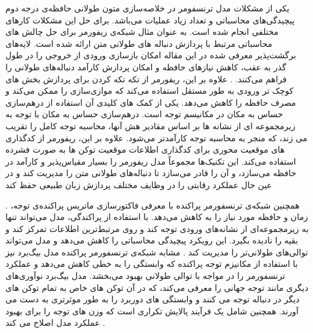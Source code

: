یکی از مشکلات مدل ترنسفومر در خلاصه‌سازی متون طولانی حافظه‌ی درجه دوم پیچیدگی‌های محاسباتی و تعداد زیاد عملیات می‌باشد. برای حل این مشکلات کار‌های مختلفی انجام شده است. به عنوان مثال شبکه‌ی ریفورمر
  برای حل چالش های محاسباتی مرتبط با پردازش دنباله های طولانی متن ارائه شده است.  لایه‌های برگشت‌پذیر
   معرفی شده در این مقاله امکان بازسازی ورودی از خروجی را در طول گذر به عقب، کاهش نیازهای حافظه و امکان پردازش کارآمد دنباله‌های طولانی را فراهم می‌کنند.
   . علاوه بر این، ریفورمر  از تکه تکه کردن برای پردازش بخش های کوچک تر ورودی به طور مستقل استفاده می‌کند که موازی‌سازی را ممکن می‌کند و مصرف حافظه را کاهش می‌دهد. یکی از کمک های کلیدی آن استفاده از درهم‌سازی حساس به مکان  در مکانیسم توجه 
  است. درهم‌سازی حساس به مکان با توجه به زیرمجموعه ای از نشانه ها بر اساس مقادیر هش آنها، محاسبه توجه کامل را تقریب می زند، که منجر به محاسبه توجه کارآمدتر می‌شود. علاوه بر این، ریفورمر از کدگذاری های موقعیت محوری برای کدگذاری اطلاعات موقعیت توکن ها به صورت فشرده استفاده می‌کند. این تکنیک‌ها مجموعاً مدل ریفورمر را بسیار مقیاس‌پذیر و کارآمد در حافظه می‌سازد، و آن را قادر می‌سازد تا دنباله‌های طولانی متن را مدیریت کند و در عین حال عملکرد رقابتی را در وظایف مختلف پردازش زبان طبیعی حفظ کند
 \cite{reformer}
 
 . همچنین شبکه‌ی ترنسفورمر پراکنده 
  با معرفی فاکتورسازی‌ ماتریس پراکنده‌ی توجه، زمان و حافظه مورد نیاز را به کاهش می‌دهد.
   با استفاده از پراکندگی، مدل می‌تواند تنها به زیرمجموعه‌ای از نشانه‌های ورودی توجه کند و روی مرتبط‌ترین اطلاعات تمرکز کند و بقیه را نادیده بگیرد. این رویکرد پیچیدگی محاسباتی را کاهش می‌دهد و مدل می‌تواند توالی‌های طولانی‌تر را مدیریت کند
\cite{child2019generating}
  . مشابه شبکه‌ی ترنسفورمر پراکنده مدل بیگ‌برد نیز
   با استفاده از مکانیزم توجه پراکنده
   که وابستگی را به خطی کاهش ‌می‌دهد و عملکرد ترنسفورمر را در مواجه با توالی
   طولانی بهبود می‌بخشد. مدل بیگ‌برد نوآوری‌های دیگری مانند توجه جهانی
    را معرفی می‌کند، که در آن توکن های خاص به تمام توکن های دیگر در دنباله توجه می کنند و وابستگی های دوربرد را به طور موثرتری به دست می آورند. همچنین شامل یک فرآیند پالایش تکراری است که وزن های توجه را برای بهبود عملکرد مدل اصلاح می کند
     \cite{zaheer2020big}. 
    
    
    
